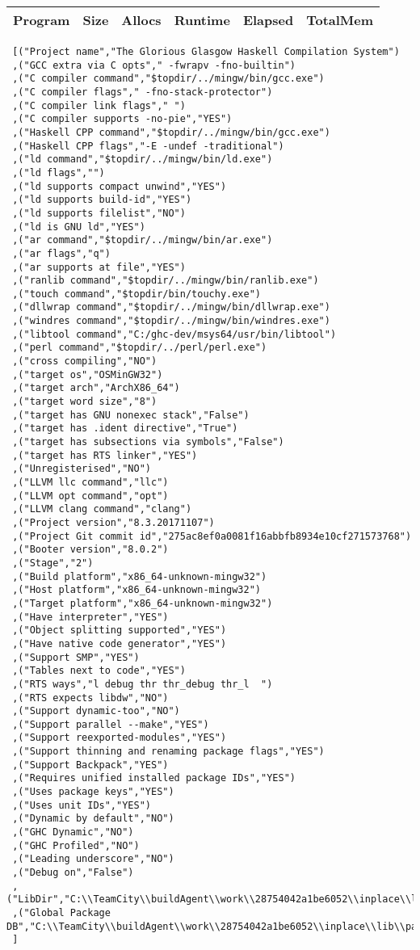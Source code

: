 \begin{tabular}{ c c c c c c }
Program & Size & Allocs & Runtime & Elapsed & TotalMem\\
\hline
\end{tabular}
\begin{verbatim}
 [("Project name","The Glorious Glasgow Haskell Compilation System")
 ,("GCC extra via C opts"," -fwrapv -fno-builtin")
 ,("C compiler command","$topdir/../mingw/bin/gcc.exe")
 ,("C compiler flags"," -fno-stack-protector")
 ,("C compiler link flags"," ")
 ,("C compiler supports -no-pie","YES")
 ,("Haskell CPP command","$topdir/../mingw/bin/gcc.exe")
 ,("Haskell CPP flags","-E -undef -traditional")
 ,("ld command","$topdir/../mingw/bin/ld.exe")
 ,("ld flags","")
 ,("ld supports compact unwind","YES")
 ,("ld supports build-id","YES")
 ,("ld supports filelist","NO")
 ,("ld is GNU ld","YES")
 ,("ar command","$topdir/../mingw/bin/ar.exe")
 ,("ar flags","q")
 ,("ar supports at file","YES")
 ,("ranlib command","$topdir/../mingw/bin/ranlib.exe")
 ,("touch command","$topdir/bin/touchy.exe")
 ,("dllwrap command","$topdir/../mingw/bin/dllwrap.exe")
 ,("windres command","$topdir/../mingw/bin/windres.exe")
 ,("libtool command","C:/ghc-dev/msys64/usr/bin/libtool")
 ,("perl command","$topdir/../perl/perl.exe")
 ,("cross compiling","NO")
 ,("target os","OSMinGW32")
 ,("target arch","ArchX86_64")
 ,("target word size","8")
 ,("target has GNU nonexec stack","False")
 ,("target has .ident directive","True")
 ,("target has subsections via symbols","False")
 ,("target has RTS linker","YES")
 ,("Unregisterised","NO")
 ,("LLVM llc command","llc")
 ,("LLVM opt command","opt")
 ,("LLVM clang command","clang")
 ,("Project version","8.3.20171107")
 ,("Project Git commit id","275ac8ef0a0081f16abbfb8934e10cf271573768")
 ,("Booter version","8.0.2")
 ,("Stage","2")
 ,("Build platform","x86_64-unknown-mingw32")
 ,("Host platform","x86_64-unknown-mingw32")
 ,("Target platform","x86_64-unknown-mingw32")
 ,("Have interpreter","YES")
 ,("Object splitting supported","YES")
 ,("Have native code generator","YES")
 ,("Support SMP","YES")
 ,("Tables next to code","YES")
 ,("RTS ways","l debug thr thr_debug thr_l  ")
 ,("RTS expects libdw","NO")
 ,("Support dynamic-too","NO")
 ,("Support parallel --make","YES")
 ,("Support reexported-modules","YES")
 ,("Support thinning and renaming package flags","YES")
 ,("Support Backpack","YES")
 ,("Requires unified installed package IDs","YES")
 ,("Uses package keys","YES")
 ,("Uses unit IDs","YES")
 ,("Dynamic by default","NO")
 ,("GHC Dynamic","NO")
 ,("GHC Profiled","NO")
 ,("Leading underscore","NO")
 ,("Debug on","False")
 ,("LibDir","C:\\TeamCity\\buildAgent\\work\\28754042a1be6052\\inplace\\lib")
 ,("Global Package DB","C:\\TeamCity\\buildAgent\\work\\28754042a1be6052\\inplace\\lib\\package.conf.d")
 ]
\end{verbatim}
